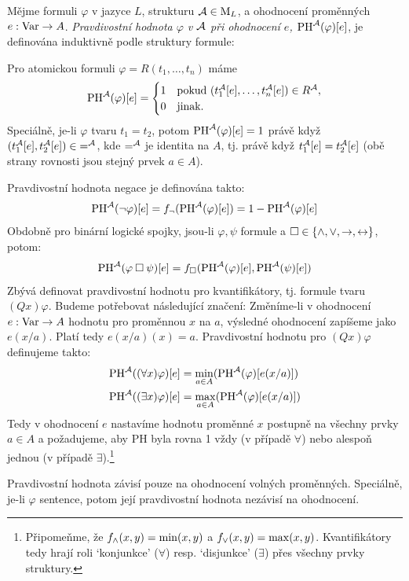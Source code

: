 \begin{definition}
Mějme formuli $\varphi$ v jazyce $L$, strukturu $\mathcal{A}\in\operatorname{M}_L$,  a ohodnocení proměnných $e:\operatorname{Var}\to A$. \emph{Pravdivostní hodnota $\varphi$ v $\mathcal{A}$ při ohodnocení $e$, $\mathrm{PH}^{\mathcal{A}}(\varphi)[e]$}, je definována induktivně podle struktury formule:

Pro atomickou formuli $\varphi=R(t_1,\dots,t_n)$ máme 
$$
\mathrm{PH}^{\mathcal{A}}(\varphi)[e]=
\begin{cases}
    1 & \text{pokud }(t_1^{\mathcal{A}}[e],\dots,t_n^{\mathcal{A}}[e])\in R^{\mathcal{A}},\\
    0 & \text{jinak.}    
\end{cases}
$$
Speciálně, je-li $\varphi$ tvaru $t_1=t_2$, potom $\mathrm{PH}^{\mathcal{A}}(\varphi)[e]=1$ právě když $(t_1^{\mathcal{A}}[e],t_2^{\mathcal{A}}[e])\in {=^{\mathcal{A}}}$, kde $=^{\mathcal{A}}$ je identita na $A$, tj. právě když $t_1^{\mathcal{A}}[e]=t_2^{\mathcal{A}}[e]$ (obě strany rovnosti jsou stejný prvek $a\in A$).

Pravdivostní hodnota negace je definována takto:
$$
\mathrm{PH}^{\mathcal{A}}(\neg \varphi)[e]=f_\neg(\mathrm{PH}^{\mathcal{A}}(\varphi)[e])=1-\mathrm{PH}^{\mathcal{A}}(\varphi)[e]
$$
Obdobně pro binární logické spojky, jsou-li $\varphi,\psi$ formule a ${\mathbin{\square}}\in\{{\land},{\lor},{\mathbin{\rightarrow}},{\mathbin{\leftrightarrow}}\}$, potom:
$$
\mathrm{PH}^{\mathcal{A}}(\varphi\mathbin{\square}\psi)[e]=f_{\mathbin{\square}}(\mathrm{PH}^{\mathcal{A}}(\varphi)[e],\mathrm{PH}^{\mathcal{A}}(\psi)[e])
$$
Zbývá definovat pravdivostní hodnotu pro kvantifikátory, tj. formule tvaru $(Qx)\varphi$. Budeme potřebovat následující značení: Změníme-li v ohodnocení $e:\operatorname{Var}\to A$ hodnotu pro proměnnou $x$ na $a$, výsledné ohodnocení zapíšeme jako $e(x/a)$. Platí tedy $e(x/a)(x)=a$. Pravdivostní hodnotu pro $(Qx)\varphi$ definujeme takto:
\begin{align*}
    \mathrm{PH}^{\mathcal{A}}((\forall x)\varphi)[e]&=\min_{a\in A}(\mathrm{PH}^{\mathcal{A}}(\varphi)[e(x/a)])\\ 
    \mathrm{PH}^{\mathcal{A}}((\exists x)\varphi)[e]&=\max_{a\in A}(\mathrm{PH}^{\mathcal{A}}(\varphi)[e(x/a)])
\end{align*}
Tedy v ohodnocení $e$ nastavíme hodnotu proměnné $x$ postupně na všechny prvky $a\in A$ a požadujeme, aby PH byla rovna 1 vždy (v případě $\forall$) nebo alespoň jednou (v případě $\exists$).\footnote{Připomeňme, že $f_{\land}(x,y)=\min(x,y)$ a $f_{\lor}(x,y)=\max(x,y)$. Kvantifikátory tedy hrají roli `konjunkce' ($\forall$) resp. `disjunkce' ($\exists$) přes všechny prvky struktury.}
\end{definition}

\begin{remark}
    Pravdivostní hodnota závisí pouze na ohodnocení volných proměnných. Speciálně, je-li $\varphi$ sentence, potom její pravdivostní hodnota nezávisí na ohodnocení.
\end{remark}

